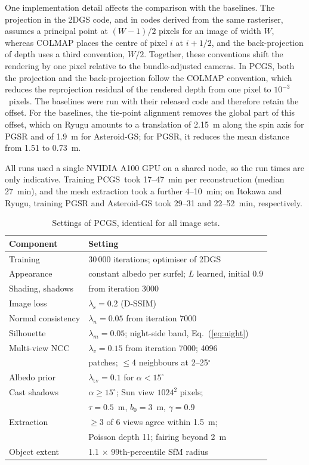\documentclass[fleqn,usenatbib]{aa}
\newcommand{\pcgs}{PCGS}
\begin{document}
One implementation detail affects the comparison with the baselines. The projection in the 2DGS code, and in codes
derived from the same rasteriser, assumes a principal point at $(W-1)/2$ pixels for an image of width $W$, whereas
COLMAP places the centre of pixel $i$ at $i+1/2$, and the back-projection of depth uses a third convention, $W/2$.
Together, these conventions shift the rendering by one pixel relative to the bundle-adjusted cameras. In \pcgs, both
the projection and the back-projection follow the COLMAP convention, which reduces the reprojection residual of the
rendered depth from one pixel to $10^{-3}$~pixels. The baselines were run with their released code and therefore retain
the offset. For the baselines, the tie-point alignment removes the global part of this offset, which on Ryugu amounts to a
translation of 2.15~m along the spin axis for PGSR and of 1.9~m for Asteroid-GS; for PGSR, it reduces the mean
distance from 1.51 to 0.73~m.

All runs used a single NVIDIA A100 GPU on a shared node, so the run times are only indicative. Training \pcgs\ took
17--47~min per reconstruction (median 27~min), and the mesh extraction took a further 4--10~min; on Itokawa and Ryugu,
training PGSR and Asteroid-GS took 29--31 and 22--52~min, respectively.

\begin{table}
\caption{Settings of \pcgs, identical for all image sets.}
\label{tab:settings}
\centering
\footnotesize\setlength{\tabcolsep}{3pt}
\begin{tabular}{@{}ll@{}}
\toprule
Component & Setting \\
\midrule
Training & 30\,000 iterations; optimiser of 2DGS \\
Appearance & constant albedo per surfel; $L$ learned, initial 0.9 \\
Shading, shadows & from iteration 3000 \\
Image loss & $\lambda_\mathrm{s}=0.2$ (D-SSIM) \\
Normal consistency & $\lambda_n=0.05$ from iteration 7000 \\
Silhouette & $\lambda_m=0.05$; night-side band, Eq.~(\ref{eq:night}) \\
Multi-view NCC & $\lambda_v=0.15$ from iteration 7000; 4096 \\
 & patches; $\leq$4 neighbours at 2--25$^\circ$ \\
Albedo prior & $\lambda_\mathrm{tv}=0.1$ for $\alpha<15^\circ$ \\
Cast shadows & $\alpha\geq15^\circ$; Sun view $1024^2$ pixels; \\
 & $\tau=0.5$~m, $b_0=3$~m, $\gamma=0.9$ \\
Extraction & $\geq$3 of 6 views agree within 1.5~m; \\
 & Poisson depth 11; fairing beyond 2~m \\
Object extent & 1.1 $\times$ 99th-percentile SfM radius \\
\bottomrule
\end{tabular}
\end{table}
\end{document}
